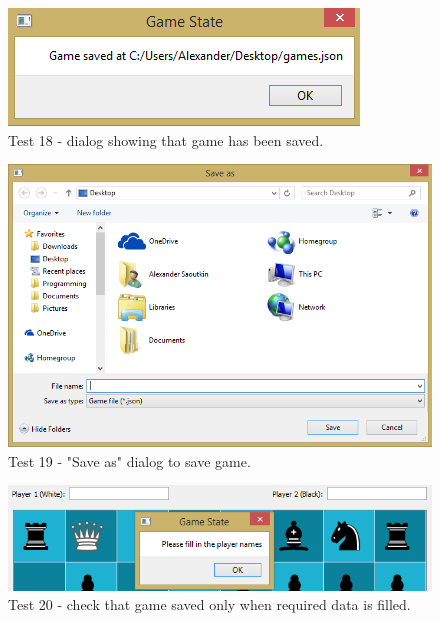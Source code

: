 \begin{figure}[H]
	\centering
	\includegraphics{images/screenshots/test-18}
	\caption{Test 18 - dialog showing that game has been saved.}
	\label{test-18}
\end{figure}
\begin{figure}[H]
	\centering
	\includegraphics[width=1.0\textwidth]{images/screenshots/test-17}
	\caption{Test 19 - "Save as" dialog to save game.}
	\label{test-19}
\end{figure}
\begin{figure}[H]
	\centering
	\includegraphics[width=1.0\textwidth]{images/screenshots/test-20}
	\caption{Test 20 - check that game saved only when required data is filled.}
	\label{test-20}
\end{figure}

